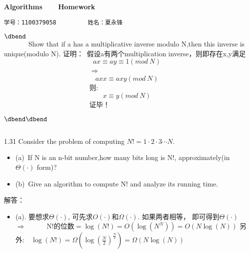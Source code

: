 \documentclass[11pt,a4paper]{article}
\begin{document}
\begin{CJK*}{UTF8}{gbsn}
\begin{center}
\Large \bf Algorithms\ \ \ \ Homework
\end{center}
\begin{center}
\tt 学号：1100379058\ \ \ \ \ \ \ \ \ 姓名：夏永锋 
\end{center}
$\vbox{\hbox{\dbend}\vskip 11pt}$ Show that if a has a multiplicative inverse modulo N,then this inverse is unique(modulo N).\newline\newline
证明：\ 假设a有两个multiplication inverse，则即存在x,y满足
\begin{equation}
ax\equiv ay\equiv 1 (mod\ N)
\end{equation}
\ \ \ \ \ \ \ \ \ \ \ \ \ \ \ \ \ \ \ 
\ \ \ \ \ \ $\Rightarrow$ 
\begin{equation}
axx\equiv axy (mod\ N)
\end{equation}
\ \ \ \ \ \ \ \ \ \ \ \ \ \ \ \ \ \ \ 
\ \ \ \ \ \ 则:
\begin{equation}
x\equiv y (mod\ N)
\end{equation}
\ \ \ \ \ \ \ \ \ \ \ \ \ \ \ \ \ \ \ 
\ \ \ \ \ \ 证毕！
\begin{flushleft}
$\vbox{\hbox{\dbend\dbend}\vskip 11pt}$
\end{flushleft}
1.31 Consider the problem of computing $N!=1\cdot2\cdot3\cdots N.$
\flushleft
\begin{enumerate}
	\begin{itemize}
		\item (a)\ If N is an n-bit number,how many bits long is N!, approximately(in $\Theta(\cdot)$ form)?
		\item (b)\ Give an algorithm to compute N! and analyze its running time.
	\end{itemize}
\end{enumerate}
\begin{enumerate}
解答：
	\begin{itemize}
		\item (a). 要想求$\Theta(\cdot)$, 可先求$O(\cdot)$和$\Omega(\cdot)$. 如果两者相等， 即可得到$\Theta(\cdot)$
		$\Rightarrow$\ \ \ \ \ \ N!的位数$=\log(N!)=O(\log(N^N))=O(N\log(N))$\newline
		另外:\ \ $\log(N!)=\Omega(\log(\frac{N}{2})^\frac{N}{2})=\Omega(N\log(N))$\newline

\end{itemize}
\end{enumerate}
\end{CJK*}
\end{document}
